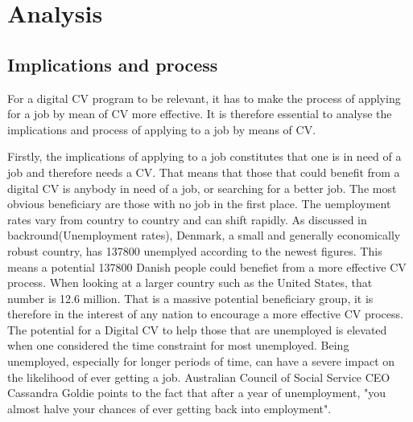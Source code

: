 \section{Analysis}\label{sec:analysis}

\subsection{Implications and process}
For a digital CV program to be relevant, it has to make the process of applying for a job by mean of CV more effective.  
It is therefore essential to analyse the implications and process of applying to a job by means of CV.

Firstly, the implications of applying to a job constitutes that one is in need of a job and therefore needs a CV.
That means that those that could benefit from a digital CV is anybody in need of a job, or searching for a better job. 
The most obvious beneficiary are those with no job in the first place. 
The uemployment rates vary from country to country and can shift rapidly.
As discussed in backround(Unemployment rates), Denmark, a small and generally economically robust country, has 137800 unemplyed according to the newest figures. 
This means a potential 137800 Danish people could benefiet from a more effective CV process. 
When looking at a larger country such as the United States, that number is 12.6 million.
That is a massive potential beneficiary group, it is therefore in the interest of any nation to encourage a more effective CV process.
The potential for a Digital CV to help those that are unemployed is elevated when one considered the time constraint for most unemployed.
Being unemployed, especially for longer periods of time, can have a severe impact on the likelihood of ever getting a job.
Australian Council of Social Service CEO Cassandra Goldie points to the fact that after a year of unemployment, "you almost halve your chances of ever getting back into employment".

